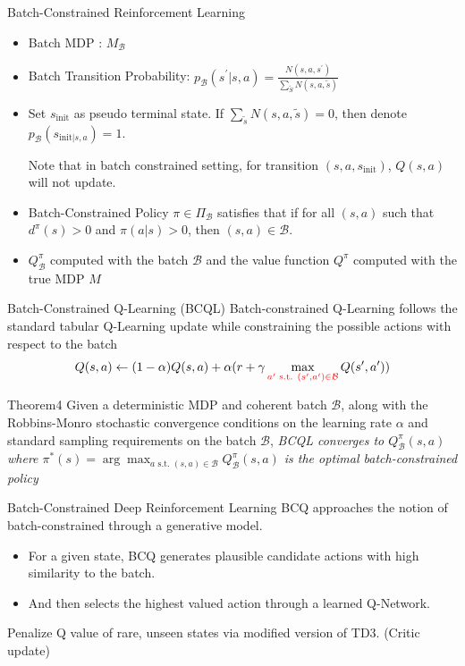 \documentclass[11pt]{beamer}
\newcommand{\mc}[1]{\mathcal{#1}}
\newcommand{\ti}[1]{\textit{#1}}
\begin{document}
\begin{frame}{Batch-Constrained Reinforcement Learning}
    \begin{itemize}
        \item Batch MDP : $M_{\mc{B}}$
        \item Batch Transition Probability: $p_{\mc{B}}(s^\prime|s,a) = \frac{N(s,a,s^\prime)}{\sum_{\tilde{S}}N(s,a,\tilde{s})}$


        \item Set $s_{\text{init}}$ as pseudo terminal state. If $\sum_{\tilde{s}} N(s,a, \tilde{s}) = 0$, then denote $p_{\mc{B}}(s_{\text{{init}}|s,a}) = 1$.

        Note that in batch constrained setting, for transition $(s,a,s_{\text{init}})$, $Q(s,a)$ will not update.
        \item Batch-Constrained Policy $\pi \in \Pi_{\mc{B}}$ satisfies that if for all $(s,a)$ such that $d^{\pi}(s) > 0$ and $\pi(a|s)>0$, then $(s,a) \in \mc{B}$.
        \item $Q^\pi_{\mc{B}}$ computed with the batch $\mc{B}$ and the value function $Q^\pi$ computed with the true MDP $M$
    \end{itemize}

    \begin{block}{Batch-Constrained Q-Learning (BCQL)}
        Batch-constrained Q-Learning follows the standard tabular Q-Learning update while constraining the possible actions with respect to the batch
        \[
            Q(s,a) \leftarrow (1-\alpha) Q(s,a) + \alpha (r + \gamma \max_{ \textcolor{red}{a^\prime \text{ s.t. }(s^\prime, a^\prime) \in \mc{B}}} Q(s^\prime, a^\prime))
        \]
    \end{block}

    \begin{block}{Theorem4}
        Given a deterministic MDP and coherent batch $\mc{B}$, along with the Robbins-Monro stochastic convergence conditions on the learning rate $\alpha$ and standard sampling requirements on the batch $\mc{B}$, \ti{BCQL converges to $Q^{\pi}_\mc{B} (s,a)$ where $\pi^\ast(s) = \arg\max_{a \text{ s.t. }(s,a) \in \mc{B}} Q^\pi_{\mc{B}}(s,a)$ is the optimal batch-constrained policy}
    \end{block}

\end{frame}

\begin{frame}{Batch-Constrained Deep Reinforcement Learning}
    BCQ approaches the notion of batch-constrained through a generative model.
    \begin{itemize}
        \item For a given state, BCQ generates plausible candidate actions with high similarity to the batch.
        \item And then selects the highest valued action through a learned Q-Network.
    \end{itemize}

    Penalize Q value of rare, unseen states via modified version of TD3. (Critic update)
\end{frame}
\end{document}
